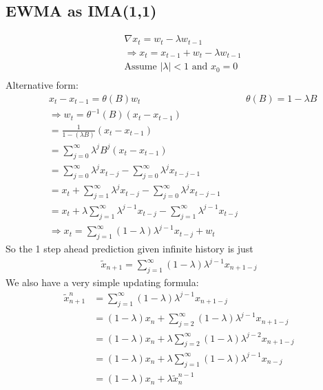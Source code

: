 \subsection{EWMA as IMA(1,1)} 
    \begin{align*}
        & \nabla x_t = w_t - \lambda w_{t-1} \\
        & \Longrightarrow x_t = x_{t-1} + w_t - \lambda w_{t-1} \\
        & \textrm{Assume $|\lambda| < 1$ and $x_0 = 0$}\\
    \end{align*}
Alternative form: 
    \begin{align*}
        & x_t - x_{t-1} = \theta(B) w_t & \theta(B) = 1-\lambda B \\
        & \Longrightarrow w_t = \theta^{-1}(B) (x_t - x_{t-1})\\
        & = \frac{1}{1 - (\lambda B)}(x_t - x_{t-1})\\
        & = \sum_{j=0}^\infty \lambda^j B^j (x_t - x_{t-1})\\
        & = \sum_{j=0}^\infty \lambda^j x_{t-j} - \sum_{j=0}^\infty \lambda^j x_{t-j-1}\\
        & = x_t + \sum_{j=1}^\infty \lambda^j x_{t-j} - \sum_{j=0}^\infty \lambda^j x_{t-j-1}\\
        & =  x_t + \lambda \sum_{j=1}^\infty \lambda^{j-1} x_{t-j} - \sum_{j=1}^\infty \lambda^{j-1} x_{t-j}\\
        & \Longrightarrow x_t = \sum_{j=1}^\infty (1-\lambda)\lambda^{j-1} x_{t-j} + w_t
    \end{align*}
So the 1 step ahead prediction given infinite history is just 
    \begin{align*}
        \tilde{x}_{n+1} = \sum_{j=1}^\infty (1-\lambda)\lambda^{j-1} x_{n+1-j}
    \end{align*}
We also have a very simple updating formula: 
    \begin{align*}
        \tilde{x}_{n+1}^n
        & = \sum_{j=1}^\infty (1-\lambda)\lambda^{j-1} x_{n+1-j}\\
        & = (1-\lambda) x_{n} + \sum_{j=2}^\infty (1-\lambda) \lambda^{j-1} x_{n+1-j}\\
        & = (1-\lambda) x_{n} + \lambda \sum_{j=2}^\infty (1-\lambda) \lambda^{j-2} x_{n+1-j}\\
        & = (1-\lambda) x_{n} + \lambda \sum_{j=1}^\infty (1-\lambda) \lambda^{j-1} x_{n-j}\\
        & = (1-\lambda) x_{n} + \lambda\tilde{x}_{n}^{n-1}\\
    \end{align*}
    

